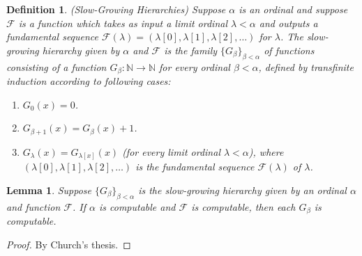 \documentclass{article}
\newtheorem{definition}[theorem]{Definition}
\newtheorem{lemma}[theorem]{Lemma}
\begin{document}
\begin{definition}
\label{slowgrowinghierarchiesdefn}
    (Slow-Growing Hierarchies)
    Suppose $\alpha$ is an ordinal and suppose $\mathcal F$ is a function which
    takes as input a limit ordinal $\lambda<\alpha$ and outputs a fundamental
    sequence $\mathcal F(\lambda)=(\lambda[0],\lambda[1],\lambda[2],\ldots)$
    for $\lambda$. The \emph{slow-growing hierarchy given by $\alpha$ and $\mathcal F$}
    is the family $\{G_\beta\}_{\beta<\alpha}$ of functions consisting of a function
    $G_\beta:\mathbb N\to\mathbb N$ for every
    ordinal $\beta<\alpha$, defined by transfinite induction according to following cases:
    \begin{enumerate}
        \item
        $G_0(x)=0$.
        \item
        $G_{\beta+1}(x) = G_\beta(x) + 1$.
        \item
        $G_{\lambda}(x) = G_{\lambda[x]}(x)$ (for every limit ordinal $\lambda<\alpha$),
        where $(\lambda[0],\lambda[1],\lambda[2],\ldots)$ is the fundamental sequence
        $\mathcal F(\lambda)$ of $\lambda$.
    \end{enumerate}
\end{definition}

\begin{lemma}
    Suppose $\{G_\beta\}_{\beta<\alpha}$ is the slow-growing hierarchy given by
    an ordinal $\alpha$ and function $\mathcal F$.
    If $\alpha$ is computable and $\mathcal F$ is computable,
    then each $G_\beta$ is computable.
\end{lemma}

\begin{proof}
By Church's thesis.
\end{proof}
\end{document}
